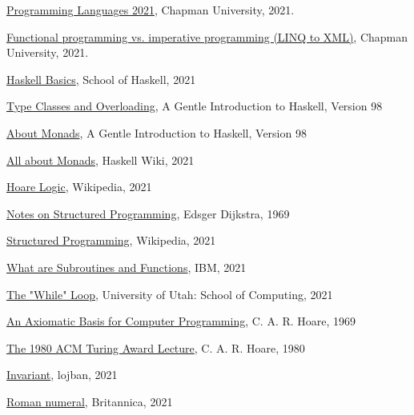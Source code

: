 \documentclass{article}
\begin{document}
\begin{thebibliography}{99}
 \href{https://github.com/alexhkurz/programming-languages-2021/blob/main/README.md}{Programming Languages 2021}, Chapman University, 2021.

 \href{https://docs.microsoft.com/en-us/dotnet/standard/linq/functional-vs-imperative-programming}{Functional programming vs. imperative programming (LINQ to XML)}, Chapman University, 2021.


 \href{https://www.schoolofhaskell.com/school/starting-with-haskell/introduction-to-haskell/1-haskell-basics}{Haskell Basics}, School of Haskell, 2021

 \href{https://www.haskell.org/tutorial/classes.html}{Type Classes and Overloading}, A Gentle Introduction to Haskell, Version 98

 \href{https://www.haskell.org/tutorial/monads.html}{About Monads}, A Gentle Introduction to Haskell, Version 98

 \href{https://wiki.haskell.org/All_About_Monads}{All about Monads}, Haskell Wiki, 2021

 \href{https://en.wikipedia.org/wiki/Hoare_logic}{Hoare Logic}, Wikipedia, 2021

 \href{https://www.cs.utexas.edu/users/EWD/ewd02xx/EWD249.PDF}{Notes on Structured Programming}, Edsger Dijkstra, 1969

 \href{https://en.wikipedia.org/wiki/Structured_programming}{Structured Programming}, Wikipedia, 2021

 \href{https://www.ibm.com/docs/en/zos/2.2.0?topic=functions-what-are-subroutines}{What are Subroutines and Functions}, IBM, 2021

 \href{https://www.cs.utah.edu/~germain/PPS/Topics/while_loops.html}{The "While" Loop}, University of Utah: School of Computing, 2021

 \href{http://sunnyday.mit.edu/16.355/Hoare-CACM-69.pdf}{An Axiomatic Basis for Computer Programming}, C. A. R. Hoare, 1969

 \href{https://dl.acm.org/doi/pdf/10.1145/1283920.1283936}{The 1980 ACM Turing Award Lecture}, C. A. R. Hoare, 1980

 \href{https://mw.lojban.org/papri/invariant_(computer_science)}{Invariant}, lojban, 2021

\href{https://www.britannica.com/topic/Roman-numeral}{Roman numeral}, Britannica, 2021


\end{thebibliography}
\end{document}
